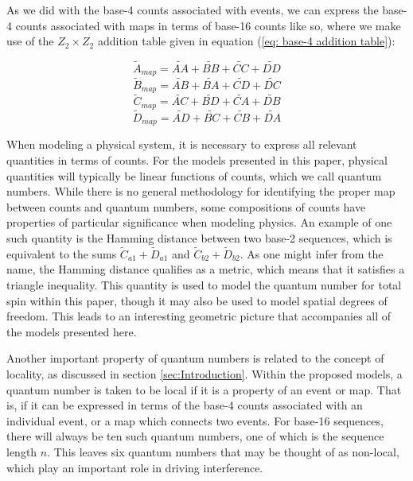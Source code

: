 \documentclass{article}
\begin{document}
As we did with the base-4 counts associated with events, we can express the base-4 counts associated with maps in terms of base-16 counts like so, where we make use of the $Z_{2}\times Z_{2}$ addition table given in equation (\ref{eq: base-4 addition table}):

\begin{equation}
\tilde{A}_{map}=\widetilde{AA}+\widetilde{BB}+\widetilde{CC}+\widetilde{DD}
\label{eq: base-4 to base-16 Amap}
\end{equation}
\begin{equation}
\tilde{B}_{map}=\widetilde{AB}+\widetilde{BA}+\widetilde{CD}+\widetilde{DC}
\label{eq: base-4 to base-16 Bmap}
\end{equation}
\begin{equation}
\tilde{C}_{map}=\widetilde{AC}+\widetilde{BD}+\widetilde{CA}+\widetilde{DB}
\label{eq: base-4 to base-16 Cmap}
\end{equation}
\begin{equation}
\tilde{D}_{map}=\widetilde{AD}+\widetilde{BC}+\widetilde{CB}+\widetilde{DA}
\label{eq: base-4 to base-16 Dmap}
\end{equation}

When modeling a physical system, it is necessary to express all relevant quantities in terms of counts. For the models presented in this paper, physical quantities will typically be linear functions of counts, which we call quantum numbers. While there is no general methodology for identifying the proper map between counts and quantum numbers, some compositions of counts have properties of particular significance when modeling physics. An example of one such quantity is the Hamming distance between two base-2 sequences, which is equivalent to the sums $\tilde{C}_{a1}+\tilde{D}_{a1}$ and $\tilde{C}_{b2}+\tilde{D}_{b2}$. As one might infer from the name, the Hamming distance qualifies as a metric, which means that it satisfies a triangle inequality. This quantity is used to model the quantum number for total spin within this paper, though it may also be used to model spatial degrees of freedom. This leads to an interesting geometric picture that accompanies all of the models presented here.

Another important property of quantum numbers is related to the concept of locality, as discussed in section \ref{sec:Introduction}. Within the proposed models, a quantum number is taken to be local if it is a property of an event or map. That is, if it can be expressed in terms of the base-4 counts associated with an individual event, or a map which connects two events. For base-16 sequences, there will always be ten such quantum numbers, one of which is the sequence length $n$. This leaves six quantum numbers that may be thought of as non-local, which play an important role in driving interference.
\end{document}
